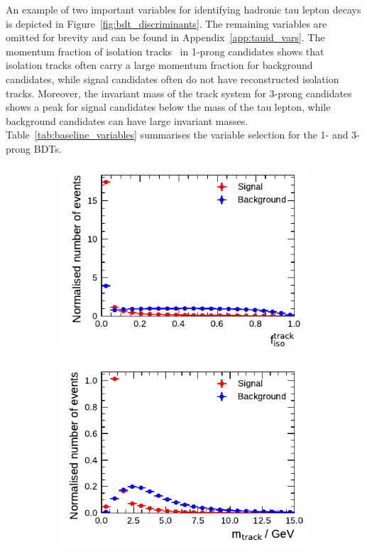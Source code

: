 An example of two important variables for identifying hadronic tau lepton decays
is depicted in Figure~\ref{fig:bdt_discriminants}. The remaining variables are
omitted for brevity and can be found in Appendix~\ref{app:tauid_vars}. The
momentum fraction of isolation tracks~ in
1-prong \tauhadvis candidates shows that isolation tracks often carry a large
momentum fraction for background candidates, while signal candidates often do
not have reconstructed isolation tracks. Moreover, the invariant mass of the
track system for 3-prong \tauhadvis candidates shows a peak for signal
candidates below the mass of the tau lepton, while background candidates can
have large invariant masses. Table~\ref{tab:baseline_variables} summarises the
variable selection for the 1- and 3-prong BDTs.

\begin{figure}[htb]
  \begin{subfigure}[t]{0.48\textwidth}
    \centering
    \includegraphics{./figures/baseline_bdt_vars/1p/SumPtTrkFrac.pdf}
    \label{fig:sumpttrkfrac}
  \end{subfigure}\hfill
  \begin{subfigure}[t]{0.48\textwidth}
    \centering
    \includegraphics{./figures/baseline_bdt_vars/3p/massTrkSys.pdf}

\end{subfigure}
\end{figure}
